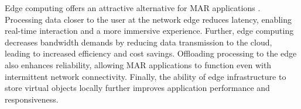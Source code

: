 
    Edge computing offers an attractive alternative for MAR applications \cite{bib:arsurvey1,bib:arvrcache}. Processing data closer to the user at the network edge reduces latency, enabling real-time interaction and a more immersive experience.  Further, edge computing decreases bandwidth demands by reducing data transmission to the cloud, leading to increased efficiency and cost savings.  Offloading processing to the edge also enhances reliability, allowing MAR applications to function even with intermittent network connectivity. Finally, the ability of edge infrastructure to store virtual objects locally further improves application performance and responsiveness.
   
    

    
